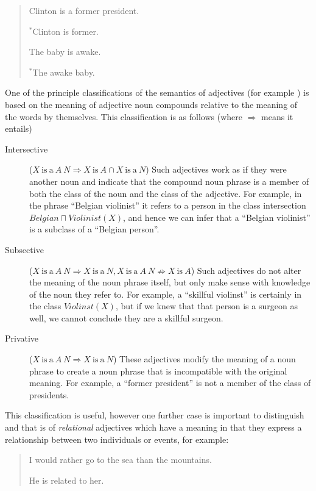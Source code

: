 \documentclass[11pt]{article}
\begin{document}
\begin{quote}
	Clinton is a former president.
	
	$^*$Clinton is former.
	
	The baby is awake.
	
	$^*$The awake baby.
\end{quote}

One of the principle classifications of the semantics of adjectives (for example \cite{partee2003there,bouillon1999description}) is based on the meaning of adjective noun compounds relative to the meaning of the words by themselves. This classification is as follows (where $\Rightarrow$ means it entails)

\begin{description}
\item[Intersective] ($X\mathrm{~is~a~}A~N \Rightarrow X\mathrm{~is~}A \cap X\mathrm{~is~a~}N$) Such adjectives work as if they were another noun and indicate that the compound noun phrase is a member of both the class of the noun and the class of the adjective. For example, in the phrase ``Belgian violinist'' it refers to a person in the class intersection $Belgian \sqcap Violinist(X)$, and hence we can infer that a ``Belgian violinist'' is a subclass of a ``Belgian person''.
\item[Subsective] ($X\mathrm{~is~a~}A~N \Rightarrow X\mathrm{~is~a~}N, X\mathrm{~is~a~}A~N \not\Rightarrow X\mathrm{~is~}A$) Such adjectives do not alter the meaning of the noun phrase itself, but only make sense with knowledge of the noun they refer to. For example, a ``skillful violinst'' is certainly in the class $Violinst(X)$, but if we knew that that person is a surgeon as well, we cannot conclude they are a skillful surgeon.
\item[Privative] ($X\mathrm{~is~a~}A~N \Rightarrow X\mathrm{~is~a~}N$) These adjectives modify the meaning of a noun phrase to create a noun phrase that is incompatible with the original meaning. For example, a ``former president'' is not a member of the class of presidents.
\end{description}

This classification is useful, however one further case is important to distinguish and that is of \emph{relational} adjectives which have a meaning in that they express a relationship between two individuals or events, for example:

\begin{quote}
I would rather go to the sea than the mountains.

He is related to her.
\end{quote}
\end{document}
